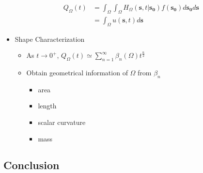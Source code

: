 \begin{itemize}
       \begin{align}
         Q_{\Omega}(t) &= \int_{\Omega} \int_{\Omega} H_{\Omega}(\bm{s}, t | \bm{s_0}) f(\bm{s_0})  d\bm{s_0} d\bm{s} \label{eq:heat_content_integral_full} \\
            &= \int_{\Omega} u(\bm{s}, t) d\bm{s} \label{eq:heat_content_integral_convol}
       \end{align}


     \item Shape Characterization

       \begin{itemize}
         \item As $t \rightarrow 0^{+}$, $Q_{\Omega}(t) \simeq \sum_{n=1}^{\infty} \beta_n(\Omega) t ^{\frac{n}{2}}$
         \item Obtain geometrical information of $\Omega$ from $\beta_n$
           \begin{itemize}
           \item area
           \item length
           \item scalar curvature
           \item mass
         \end{itemize}
       \end{itemize}
       
       
   \end{itemize}



  \subsection{Conclusion}

